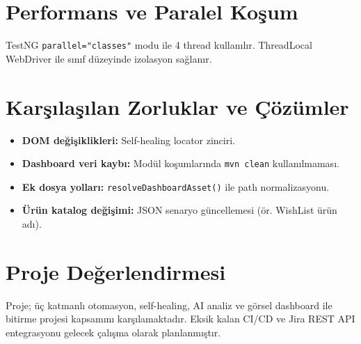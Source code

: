 \section{Performans ve Paralel Koşum}
TestNG \texttt{parallel="classes"} modu ile 4 thread kullanılır. ThreadLocal WebDriver ile sınıf düzeyinde izolasyon sağlanır.

\section{Karşılaşılan Zorluklar ve Çözümler}
\begin{itemize}
  \item \textbf{DOM değişiklikleri:} Self-healing locator zinciri.
  \item \textbf{Dashboard veri kaybı:} Modül koşumlarında \texttt{mvn clean} kullanılmaması.
  \item \textbf{Ek dosya yolları:} \texttt{resolveDashboardAsset()} ile path normalizasyonu.
  \item \textbf{Ürün katalog değişimi:} JSON senaryo güncellemesi (ör. WishList ürün adı).
\end{itemize}

\section{Proje Değerlendirmesi}
Proje; üç katmanlı otomasyon, self-healing, AI analiz ve görsel dashboard ile bitirme projesi kapsamını karşılamaktadır. Eksik kalan CI/CD ve Jira REST API entegrasyonu gelecek çalışma olarak planlanmıştır.
